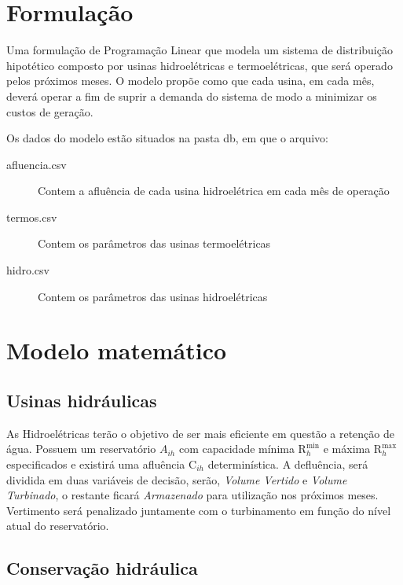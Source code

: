 \documentclass[12pt]{article}
\begin{document}

\section*{Formulação}

Uma formulação de Programação Linear que modela um sistema de distribuição hipotético composto por usinas hidroelétricas e termoelétricas, que será operado pelos próximos meses. O modelo propõe como que cada usina, em cada mês, deverá operar a fim de suprir a demanda do sistema de modo a minimizar os custos de geração.

Os dados do modelo estão situados na pasta \textrm{db}, em que o arquivo:

\begin{description}
	\item[afluencia.csv] Contem a afluência de cada usina hidroelétrica em cada mês de operação
	\item[termos.csv] Contem os parâmetros das usinas termoelétricas
	\item[hidro.csv] Contem os parâmetros das usinas hidroelétricas
\end{description}


\section*{Modelo matemático}

\subsection*{Usinas hidráulicas}

As Hidroelétricas terão o objetivo de ser mais eficiente em questão a retenção de água. Possuem um reservatório $ A_{ih} $ com capacidade mínima $ \text{R}^\text{min}_h $ e máxima $ \text{R}^\text{max}_h $ especificados e existirá uma afluência $ \text{C}_{ih} $ determinística. A defluência, será dividida em duas variáveis de decisão, serão, \textit{Volume Vertido} e \textit{Volume Turbinado}, o restante ficará \textit{Armazenado} para utilização nos próximos meses. Vertimento será penalizado juntamente com o turbinamento em função do nível atual do reservatório.

\subsection*{Conservação hidráulica}
\end{document}
